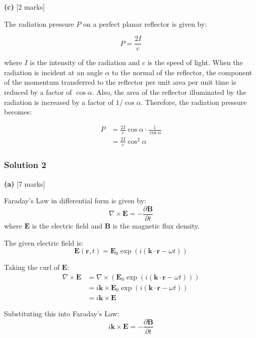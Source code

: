 \documentclass{article}
\begin{document}
\textbf{(c)} [2 marks]

The radiation pressure $P$ on a perfect planar reflector is given by:

\begin{equation*}
P = \frac{2I}{c}
\end{equation*}

where $I$ is the intensity of the radiation and $c$ is the speed of light.  When the radiation is incident at an angle $\alpha$ to the normal of the reflector, the component of the momentum transferred to the reflector per unit area per unit time is reduced by a factor of $\cos \alpha$.  Also, the area of the reflector illuminated by the radiation is increased by a factor of $1/\cos \alpha$.  Therefore, the radiation pressure becomes:

\begin{align*}
P &= \frac{2I}{c} \cos \alpha \cdot \frac{1}{\cos \alpha} \\
&= \frac{2I}{c} \cos^2 \alpha
\end{align*}

\subsubsection{Solution 2}
\textbf{(a)} [7 marks]

Faraday's Law in differential form is given by:
\begin{equation*}
\nabla \times \mathbf{E} = -\frac{\partial \mathbf{B}}{\partial t}
\end{equation*}
where $\mathbf{E}$ is the electric field and $\mathbf{B}$ is the magnetic flux density.

The given electric field is:
\begin{equation*}
\mathbf{E}(\mathbf{r}, t) = \mathbf{E}_0 \exp(i (\mathbf{k} \cdot \mathbf{r} - \omega t))
\end{equation*}

Taking the curl of $\mathbf{E}$:
\begin{align*}
\nabla \times \mathbf{E} &= \nabla \times (\mathbf{E}_0 \exp(i (\mathbf{k} \cdot \mathbf{r} - \omega t))) \\
&= i \mathbf{k} \times \mathbf{E}_0 \exp(i (\mathbf{k} \cdot \mathbf{r} - \omega t)) \\
&= i \mathbf{k} \times \mathbf{E} 
\end{align*}

Substituting this into Faraday's Law:
\begin{equation*}
i \mathbf{k} \times \mathbf{E}  = -\frac{\partial \mathbf{B}}{\partial t}
\end{equation*}
\end{document}
